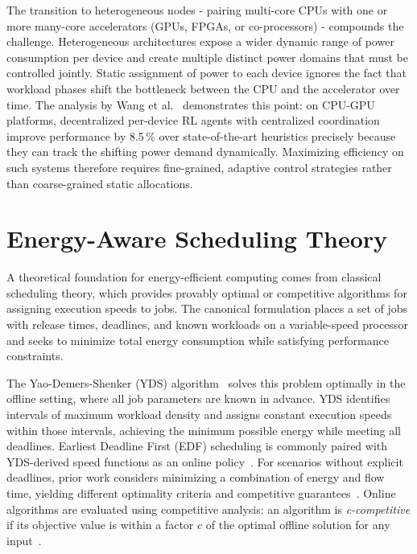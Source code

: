 The transition to heterogeneous nodes - pairing multi-core CPUs with one or more
many-core accelerators (GPUs, FPGAs, or co-processors) - compounds the challenge.
Heterogeneous architectures expose a wider dynamic range of power consumption per
device and create multiple distinct power domains that must be controlled jointly.
Static assignment of power to each device ignores the fact that workload phases
shift the bottleneck between the CPU and the accelerator over time.
The analysis by Wang et al.~\cite{10.1145/3716872} demonstrates this point: on
CPU-GPU platforms, decentralized per-device RL agents with centralized coordination
improve performance by 8.5\,\% over state-of-the-art heuristics precisely because
they can track the shifting power demand dynamically.
Maximizing efficiency on such systems therefore requires fine-grained, adaptive
control strategies rather than coarse-grained static allocations.

\section{Energy-Aware Scheduling Theory}

A theoretical foundation for energy-efficient computing comes from classical
scheduling theory, which provides provably optimal or competitive algorithms for
assigning execution speeds to jobs.
The canonical formulation places a set of jobs with release times, deadlines, and
known workloads on a variable-speed processor and seeks to minimize total energy
consumption while satisfying performance constraints.

The Yao-Demers-Shenker (YDS) algorithm~\cite{YDS} solves this problem optimally
in the offline setting, where all job parameters are known in advance.
YDS identifies intervals of maximum workload density and assigns constant execution
speeds within those intervals, achieving the minimum possible energy while meeting
all deadlines.
Earliest Deadline First (EDF) scheduling is commonly paired with YDS-derived speed
functions as an online policy~\cite{YDS}.
For scenarios without explicit deadlines, prior work considers minimizing a
combination of energy and flow time, yielding different optimality criteria and
competitive guarantees~\cite{ALBERS20151194}.
Online algorithms are evaluated using competitive analysis: an algorithm is
\emph{c-competitive} if its objective value is within a factor $c$ of the optimal
offline solution for any input~\cite{YDS,ALBERS20151194}.

